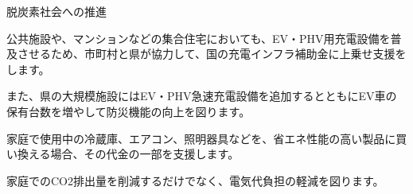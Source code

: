 \documentclass[dvipdfmx]{beamer}
\begin{document}
    \begin{frame}{脱炭素社会への推進}{}
        \begin{small}
            \begin{description}
                \setlength{\parsep}{.5mm}
                \setlength{\itemsep}{2mm}
                \item[電気自動車（EV）の普及支援] \mbox{}\par
                公共施設や、マンションなどの集合住宅においても、EV・PHV用充電設備を普及させるため、市町村と県が協力して、国の充電インフラ補助金に上乗せ支援をします。\par
                また、県の大規模施設にはEV・PHV急速充電設備を追加するとともにEV車の保有台数を増やして防災機能の向上を図ります。
                \item[省エネ家電の買い換え支援] \mbox{}\par
                家庭で使用中の冷蔵庫、エアコン、照明器具などを、省エネ性能の高い製品に買い換える場合、その代金の一部を支援します。\par
                家庭でのCO2排出量を削減するだけでなく、電気代負担の軽減を図ります。
            \end{description}
        \end{small}
    \end{frame}
    
\end{document}
